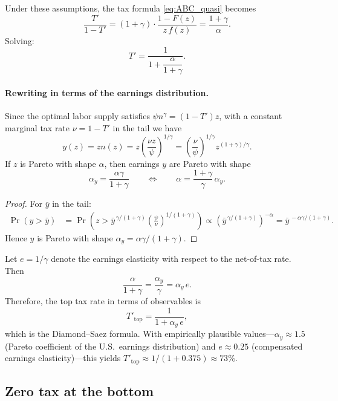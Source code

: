 \documentclass[12pt,a4paper]{article}
\theoremstyle{definition}
\theoremstyle{plain}
\theoremstyle{remark}
\begin{document}
Under these assumptions, the tax formula \eqref{eq:ABC_quasi} becomes
\[
  \frac{T'}{1-T'} = (1 + \gamma) \cdot \frac{1 - F(z)}{z \, f(z)} = \frac{1+\gamma}{\alpha}.
\]
Solving:
\begin{equation}
\label{eq:top_rate_z}
  T' = \frac{1}{1 + \dfrac{\alpha}{1+\gamma}}.
\end{equation}

\paragraph{Rewriting in terms of the earnings distribution.} Since the optimal labor supply satisfies $\psi n^\gamma = (1-T')z$, with a constant marginal tax rate $\nu = 1-T'$ in the tail we have
\[
  y(z) = zn(z) = z \left(\frac{\nu z}{\psi}\right)^{1/\gamma}
  = \left(\frac{\nu}{\psi}\right)^{1/\gamma} z^{(1+\gamma)/\gamma}.
\]
If $z$ is Pareto with shape $\alpha$, then earnings $y$ are Pareto with shape
\[
  \alpha_y = \frac{\alpha \gamma}{1+\gamma}
  \qquad \Longleftrightarrow \qquad
  \alpha = \frac{1+\gamma}{\gamma}\,\alpha_y.
\]

\begin{proof}
For $\bar y$ in the tail:
\begin{align*}
  \Pr(y > \bar y) &= \Pr\!\left(z > \bar y^{\,\gamma/(1+\gamma)} \left(\frac{\psi}{\nu}\right)^{1/(1+\gamma)}\right)
  \propto \left(\bar y^{\,\gamma/(1+\gamma)}\right)^{-\alpha} = \bar y^{\,-\alpha\gamma/(1+\gamma)}.
\end{align*}
Hence $y$ is Pareto with shape $\alpha_y = \alpha\gamma/(1+\gamma)$.
\end{proof}

Let $e = 1/\gamma$ denote the earnings elasticity with respect to the net-of-tax rate. Then
\[
  \frac{\alpha}{1+\gamma} = \frac{\alpha_y}{\gamma} = \alpha_y \, e.
\]
Therefore, the top tax rate in terms of observables is
\begin{equation}
\label{eq:top_rate_DS}
  \boxed{
  T'_{\text{top}} = \frac{1}{1 + \alpha_y \, e},
  }
\end{equation}
which is the Diamond--Saez formula. With empirically plausible values---$\alpha_y \approx 1.5$ (Pareto coefficient of the U.S.\ earnings distribution) and $e \approx 0.25$ (compensated earnings elasticity)---this yields $T'_{\text{top}} \approx 1/(1 + 0.375) \approx 73\%$.

\subsection{Zero tax at the bottom}
\end{document}
